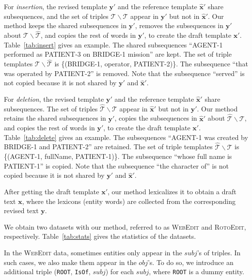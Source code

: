 \documentclass[11pt,a4paper]{article}
\begin{document}
For \textit{insertion}, the revised template $\boldsymbol{y}'$ and the reference template $\hat{\boldsymbol{x}}'$ share subsequences, and the set of triples $\mathcal{T}\backslash\hat{\mathcal{T}}$ appear in $\boldsymbol{y}'$ but not in $\hat{\boldsymbol{x}}'$.  Our method keeps the shared subsequences in $\boldsymbol{y}'$, removes the subsequences in $\boldsymbol{y}'$ about $\mathcal{T}\backslash\hat{\mathcal{T}}$, and copies the rest of words in $\boldsymbol{y}'$, to create the draft template $\boldsymbol{x}'$. Table~\ref{tab:insert} gives an example. The shared subsequences ``AGENT-1 performed as PATIENT-3 on BRIDGE-1 mission'' are kept. The set of triple templates $\mathcal{T}\backslash\hat{\mathcal{T}}$ is \{(BRIDGE-1, operator, PATIENT-2)\}. The subsequence ``that was operated by PATIENT-2'' is removed. Note that the subsequence ``served'' is not copied because it is not shared by $\boldsymbol{y}'$ and $\hat{\boldsymbol{x}}'$.

For \textit{deletion}, the revised template $\boldsymbol{y}'$ and the reference template $\hat{\boldsymbol{x}}'$ share subsequences. The set of triples $\hat{\mathcal{T}}\backslash\mathcal{T}$ appear in $\hat{\boldsymbol{x}}'$ but not in $\boldsymbol{y}'$.  Our method retains the shared subsequences in $\boldsymbol{y}'$, copies the subsequences in $\hat{\boldsymbol{x}}'$ about $\hat{\mathcal{T}}\backslash\mathcal{T}$, and copies the rest of words in $\boldsymbol{y}'$, to create the draft template $\boldsymbol{x}'$. Table~\ref{tab:delete} gives an example. The subsequences ``AGENT-1 was created by BRIDGE-1 and PATIENT-2'' are retained. The set of triple templates $\hat{\mathcal{T}}\backslash\mathcal{T}$ is \{(AGENT-1, fullName, PATIENT-1)\}. The subsequence ``whose full name is PATIENT-1'' is copied. Note that the subsequence ``the character of'' is not copied because it is not shared by $\boldsymbol{y}'$ and $\hat{\boldsymbol{x}}'$.

After getting the draft template $\boldsymbol{x}'$, our method lexicalizes it to obtain a draft text $\boldsymbol{x}$, where the lexicons (entity words) are collected from the corresponding revised text $\boldsymbol{y}$.

We obtain two datasets with our method, referred to as \textsc{WebEdit} and \textsc{RotoEdit}, respectively.
Table~\ref{tab:stats} gives the statistics of the datasets.

In the \textsc{WebEdit} data, sometimes entities only appear in the $subj$'s of triples. In such cases, we also make them appear in the $obj$'s. To do so, we introduce an additional triple (\texttt{ROOT}, \texttt{IsOf}, $subj$) for each $subj$, where \texttt{ROOT} is a dummy entity.
\end{document}
